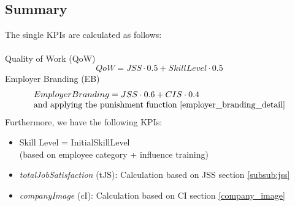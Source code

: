 \subsection{Summary}

The single KPIs are calculated as follows:\\\\
Quality of Work (\gls{QoW})
\begin{equation}
     QoW = JSS \cdot 0.5 + SkillLevel \cdot 0.5   
     \label{QoW}
\end{equation}
Employer Branding (\gls{EB})
\begin{equation}
  \begin{array}{l}
     Employer Branding = JSS \cdot 0.6 + CIS \cdot 0.4 \\ 
    \text{and applying the punishment function \ref{employer_branding_detail}} 
  \end{array}
\end{equation}
Furthermore, we have the following KPIs:

\begin{itemize}
\item Skill Level = InitialSkillLevel \\
(based on employee category + influence training)
\item \textit{totalJobSatisfaction} (tJS): Calculation based on JSS section \ref{subsub:jss}
\item \textit{companyImage} (cI): Calculation based on CI section \ref{company_image}
\end{itemize}